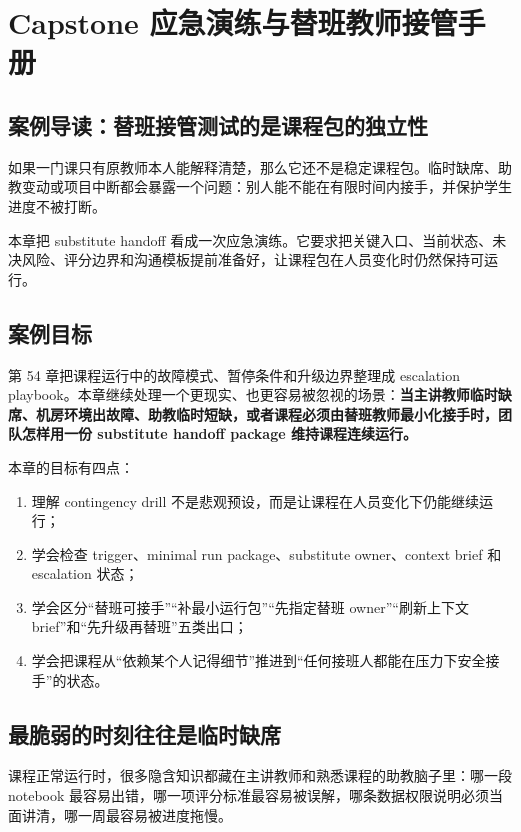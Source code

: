 \chapter{Capstone 应急演练与替班教师接管手册}

\section{案例导读：替班接管测试的是课程包的独立性}

如果一门课只有原教师本人能解释清楚，那么它还不是稳定课程包。临时缺席、助教变动或项目中断都会暴露一个问题：别人能不能在有限时间内接手，并保护学生进度不被打断。

本章把 substitute handoff 看成一次应急演练。它要求把关键入口、当前状态、未决风险、评分边界和沟通模板提前准备好，让课程包在人员变化时仍然保持可运行。

\section{案例目标}

第 54 章把课程运行中的故障模式、暂停条件和升级边界整理成 escalation playbook。本章继续处理一个更现实、也更容易被忽视的场景：\textbf{当主讲教师临时缺席、机房环境出故障、助教临时短缺，或者课程必须由替班教师最小化接手时，团队怎样用一份 substitute handoff package 维持课程连续运行。}

本章的目标有四点：

\begin{enumerate}
    \item 理解 contingency drill 不是悲观预设，而是让课程在人员变化下仍能继续运行；
    \item 学会检查 trigger、minimal run package、substitute owner、context brief 和 escalation 状态；
    \item 学会区分“替班可接手”“补最小运行包”“先指定替班 owner”“刷新上下文 brief”和“先升级再替班”五类出口；
    \item 学会把课程从“依赖某个人记得细节”推进到“任何接班人都能在压力下安全接手”的状态。
\end{enumerate}

\section{最脆弱的时刻往往是临时缺席}

课程正常运行时，很多隐含知识都藏在主讲教师和熟悉课程的助教脑子里：哪一段 notebook 最容易出错，哪一项评分标准最容易被误解，哪条数据权限说明必须当面讲清，哪一周最容易被进度拖慢。

